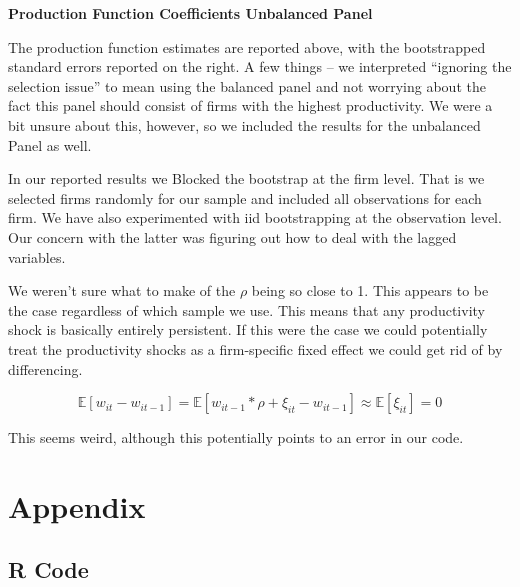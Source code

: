 \documentclass{article}
\newcommand{\E}{\mathbb{E}}
\newcommand{\1}{\mathbbm{1}}
\begin{document}
\begin{center}
	\centering
	\textbf{Production Function Coefficients Unbalanced Panel}\par\medskip
	\scalebox{1}{
		
	}
\end{center}

The production function estimates are reported above, with the bootstrapped standard errors reported on the right. A few things -- we interpreted ``ignoring the selection issue'' to mean using the balanced panel and not worrying about the fact this panel should consist of firms with the highest productivity. We were a bit unsure about this, however, so we included the results for the unbalanced Panel as well. 

In our reported results we Blocked the bootstrap at the firm level. That is we selected firms randomly for our sample and included all observations for each firm. We have also experimented with iid bootstrapping at the observation level. Our concern with the latter was figuring out how to deal with the lagged variables.

 We weren't sure what to make of the $\rho$ being so close to 1. This appears to be the case regardless of which sample we use. This means that any productivity shock is basically entirely persistent. If this were the case we could potentially treat the productivity shocks as a firm-specific fixed effect we could get rid of by differencing. 

$$\E[w_{it} - w_{it-1}]= \E[w_{it-1}*\rho +\xi_{it} - w_{it-1}] \approx \E[\xi_{it}] = 0$$

This seems weird, although this potentially points to an error in our code.




\section{Appendix}
\subsection{R Code}


\end{document}
